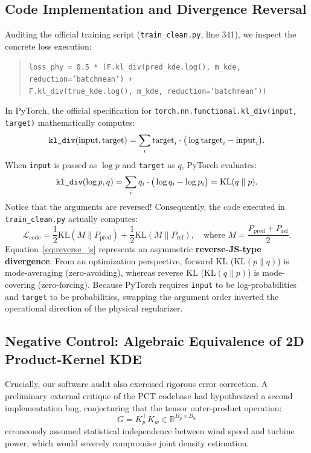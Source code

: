 \documentclass[preprint,3p,times]{elsarticle}
\begin{document}
\subsection{Code Implementation and Divergence Reversal}
Auditing the official training script (\texttt{train\_clean.py}, line 341), we inspect the concrete loss execution:
\begin{quote}
\small
\texttt{loss\_phy = 0.5 * (F.kl\_div(pred\_kde.log(), m\_kde, reduction='batchmean') +} \\
\texttt{\phantom{loss\_phy = 0.5 * (}F.kl\_div(true\_kde.log(), m\_kde, reduction='batchmean'))}
\end{quote}
In PyTorch, the official specification for \texttt{torch.nn.functional.kl\_div(input, target)} mathematically computes:
\begin{equation}
\text{\texttt{kl\_div}}(\text{input}, \text{target}) = \sum_{i} \text{target}_i \cdot \big( \log \text{target}_i - \text{input}_i \big).
\label{eq:pytorch_kl}
\end{equation}
When \texttt{input} is passed as $\log p$ and \texttt{target} as $q$, PyTorch evaluates:
\begin{equation}
\text{\texttt{kl\_div}}(\log p, q) = \sum_{i} q_i \cdot \big( \log q_i - \log p_i \big) = \text{KL}(q \parallel p).
\label{eq:reverse_kl}
\end{equation}
Notice that the arguments are reversed! Consequently, the code executed in \texttt{train\_clean.py} actually computes:
\begin{equation}
\mathcal{L}_{\text{code}} = \frac{1}{2} \text{KL}\left(M \parallel P_{\text{pred}}\right) + \frac{1}{2} \text{KL}\left(M \parallel P_{\text{ref}}\right), \quad \text{where } M = \frac{P_{\text{pred}} + P_{\text{ref}}}{2}.
\label{eq:reverse_js}
\end{equation}
Equation~\eqref{eq:reverse_js} represents an asymmetric \textbf{reverse-JS-type divergence}. From an optimization perspective, forward KL ($\text{KL}(p \parallel q)$) is mode-averaging (zero-avoiding), whereas reverse KL ($\text{KL}(q \parallel p)$) is mode-covering (zero-forcing). Because PyTorch requires \texttt{input} to be log-probabilities and \texttt{target} to be probabilities, swapping the argument order inverted the operational direction of the physical regularizer.

\subsection{Negative Control: Algebraic Equivalence of 2D Product-Kernel KDE}
Crucially, our software audit also exercised rigorous error correction. A preliminary external critique of the PCT codebase had hypothesized a second implementation bug, conjecturing that the tensor outer-product operation:
\begin{equation}
G = K_p^\top K_w \in \mathbb{R}^{B_p \times B_w}
\label{eq:outer_product}
\end{equation}
erroneously assumed statistical independence between wind speed and turbine power, which would severely compromise joint density estimation.
\end{document}
